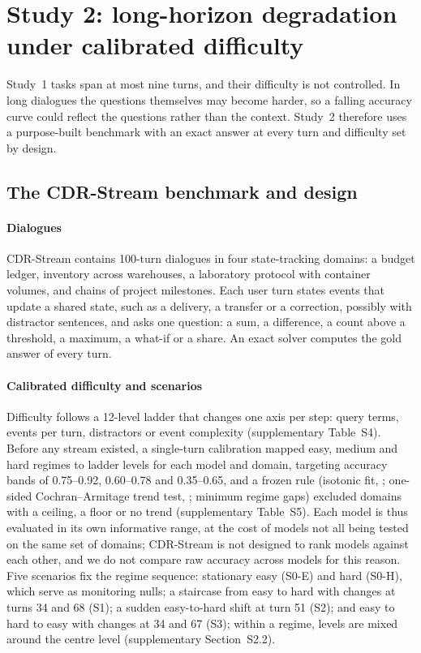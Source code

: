 \section{Study 2: long-horizon degradation under calibrated difficulty}
\label{sec:study2}

Study~1 tasks span at most nine turns, and their difficulty is not controlled.
In long dialogues the questions themselves may become harder, so a falling
accuracy curve could reflect the questions rather than the context. Study~2
therefore uses a purpose-built benchmark with an exact answer at every turn and
difficulty set by design.

\subsection{The CDR-Stream benchmark and design}

\paragraph{Dialogues}
CDR-Stream contains 100-turn dialogues in four state-tracking domains: a budget
ledger, inventory across warehouses, a laboratory protocol with container
volumes, and chains of project milestones. Each user turn states events that
update a shared state, such as a delivery, a transfer or a correction, possibly
with distractor sentences, and asks one question: a sum, a difference, a count
above a threshold, a maximum, a what-if or a share. An exact solver computes
the gold answer of every turn.

\paragraph{Calibrated difficulty and scenarios}
Difficulty follows a 12-level ladder that changes one axis per step: query
terms, events per turn, distractors or event complexity (supplementary
Table~S4). Before any stream existed, a single-turn calibration
mapped easy, medium and hard regimes to ladder levels for each model and domain,
targeting accuracy bands of 0.75--0.92, 0.60--0.78 and 0.35--0.65, and a frozen
rule (isotonic fit, \citealp{barlow1972statistical}; one-sided Cochran--Armitage
trend test, \citealp{armitage1955tests}; minimum regime gaps) excluded domains
with a ceiling, a floor or no trend (supplementary Table~S5). Each
model is thus evaluated in its own informative range, at the cost of models not
all being tested on the same set of domains; CDR-Stream is not designed to
rank models against each other, and we do not compare raw accuracy across
models for this reason. Five scenarios fix the
regime sequence: stationary easy (S0-E) and hard (S0-H), which serve as
monitoring nulls; a staircase from easy to hard with changes at turns 34 and 68
(S1); a sudden easy-to-hard shift at turn 51 (S2); and easy to hard to easy
with changes at 34 and 67 (S3); within a regime, levels are mixed around the
centre level (supplementary Section~S2.2).

